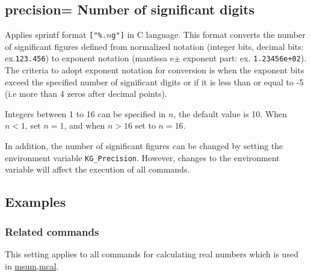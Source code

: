 %

\subsection{precision= Number of significant digits\label{sect:option_precision}}

Applies sprintf format \verb|["%.|$n$\verb|g"]| in C language.
This format converts the number of significant figures defined from normalized notation (integer bits, decimal bits: ex.\verb|123.456|) to exponent notation (mantissa e$\pm$ exponent part: ex. \verb|1.23456e+02|).
The criteria to adopt exponent notation for conversion is when the exponent bits exceed the specified number of significant digits or if it is less than or equal to -5 (i.e more than 4 zeros after decimal points).

Integers between 1 to 16 can be specified in $n$, the default value is 10.
When $n<1$, set $n=1$, and when $n>16$ set to $n=16$.  

In addition, the number of significant figures can be changed by setting the environment variable \verb|KG_Precision|. However, changes to the environment variable will affect the execution of all commands.

\subsection*{Examples}


\subsubsection*{Related commands}
This setting applies to all commands for calculating real numbers which is used in \hyperref[sect:msum]{msum},\hyperref[sect:mcal]{mcal}.


%

